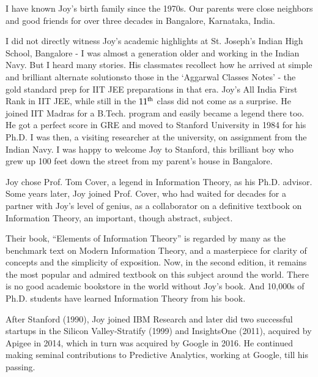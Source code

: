 \begin{multicols}{2}


I have known Joy’s birth family since the 1970s. Our parents were close neighbors and good friends for over three decades in Bangalore, Karnataka, India.

\vspace{-.1cm}

I did not directly witness Joy’s academic highlights at St. Joseph’s Indian High School, Bangalore - I was almost a generation older and working in the Indian Navy. But I heard many stories.  His classmates recollect how he arrived at simple and brilliant alternate solutionsto those in the ‘Aggarwal Classes Notes’ - the gold standard prep for IIT JEE preparations in that era. Joy’s All India First Rank in IIT JEE, while still in the $11^{\rm th}$ class did not come as a surprise. He joined IIT Madras for a B.Tech. program and easily became a legend there too. He got a perfect score in GRE and moved to Stanford University in 1984 for his Ph.D. I was then, a visiting researcher at the university, on assignment from the Indian Navy. I was happy to welcome Joy to Stanford, this brilliant boy who grew up 100 feet down the street from my parent’s house in Bangalore.

\vspace{-.1cm}

Joy chose Prof. Tom Cover, a legend in Information Theory, as his Ph.D. advisor. Some years later, Joy joined Prof. Cover, who had waited for decades for a partner with Joy’s level of genius, as a collaborator on a definitive textbook on Information Theory, an important, though abstract, subject.

\vspace{-.1cm}

Their book, “Elements of Information Theory” is regarded by many as the benchmark text on Modern Information Theory, and a masterpiece for clarity of concepts and the simplicity of exposition. Now, in the second edition, it remains the most popular and admired textbook on this subject around the world. There is no good academic bookstore in the world without Joy’s book. And 10,000s of Ph.D. students have learned Information Theory from his book.

\vspace{-.1cm}

After Stanford (1990), Joy joined IBM Research and later did two successful startups in the Silicon Valley-Stratify (1999) and InsightsOne (2011), acquired by Apigee in 2014, which in turn was acquired by Google in 2016. He continued making seminal contributions to Predictive Analytics, working at Google, till his passing.


\end{multicols}
